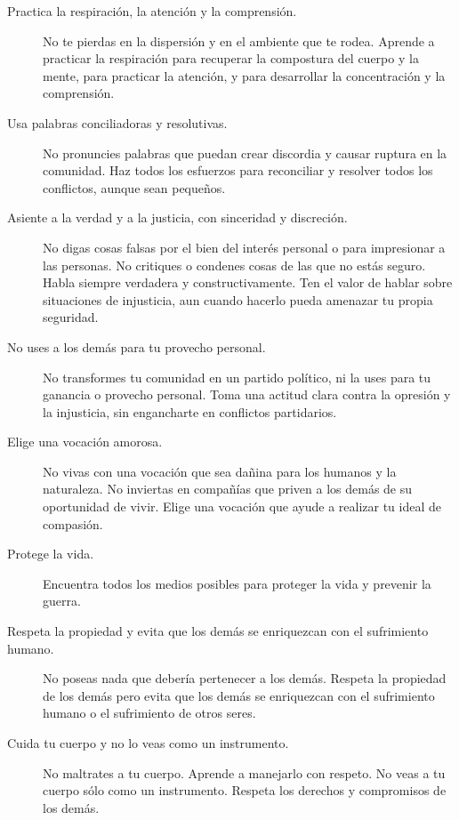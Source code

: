 \documentclass[11pt]{article}
\begin{document}
\begin{description}
\item[Practica la respiración, la atención y la comprensión.] No te pierdas en la dispersión y en el ambiente que te rodea. Aprende a practicar la respiración para recuperar la compostura del cuerpo y la mente, para practicar la atención, y para desarrollar la concentración y la comprensión.

\item[Usa palabras conciliadoras y resolutivas.] No pronuncies palabras que puedan crear discordia y causar ruptura en la comunidad. Haz todos los esfuerzos para reconciliar y resolver todos los conflictos, aunque sean pequeños.

\item[Asiente a la verdad y a la justicia, con sinceridad y discreción.] No digas cosas falsas por el bien del interés personal o para impresionar a las personas. No critiques o condenes cosas de las que no estás seguro. Habla siempre verdadera y constructivamente. Ten el valor de hablar sobre situaciones de injusticia, aun cuando hacerlo pueda amenazar tu propia seguridad.

\item[No uses a los demás para tu provecho personal.] No transformes tu comunidad en un partido político, ni la uses para tu ganancia o provecho personal. Toma una actitud clara contra la opresión y la injusticia, sin engancharte en conflictos partidarios.

\item[Elige una vocación amorosa.] No vivas con una vocación que sea dañina para los humanos y la naturaleza. No inviertas en compañías que priven a los demás de su oportunidad de vivir. Elige una vocación que ayude a realizar tu ideal de compasión.

\item[Protege la vida.] Encuentra todos los medios posibles para proteger la vida y prevenir la guerra.

\item[Respeta la propiedad y evita que los demás se enriquezcan con el sufrimiento humano.] No poseas nada que debería pertenecer a los demás. Respeta la propiedad de los demás pero evita que los demás se enriquezcan con el sufrimiento humano o el sufrimiento de otros seres.

\item[Cuida tu cuerpo y no lo veas como un instrumento.] No maltrates a tu cuerpo. Aprende a manejarlo con respeto. No veas a tu cuerpo sólo como un instrumento. Respeta los derechos y compromisos de los demás.
\end{description}

\medskip
{} ~~~~~
\end{document}
